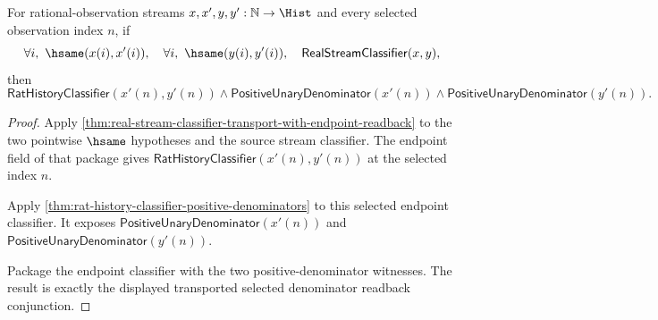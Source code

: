 \begin{theorem}
\label{thm:real-stream-classifier-transported-selected-positive-denominator-package}
For rational-observation streams $x,x',y,y':\mathbb{N}\to\Hist$ and every
selected observation index $n$, if
$$
\forall i,\ \hsame(x(i),x'(i)),\quad
\forall i,\ \hsame(y(i),y'(i)),\quad
\mathsf{RealStreamClassifier}(x,y),
$$
then
$$
\mathsf{RatHistoryClassifier}(x'(n),y'(n))\land
\mathsf{PositiveUnaryDenominator}(x'(n))\land
\mathsf{PositiveUnaryDenominator}(y'(n)).
$$
\end{theorem}
\begin{proof}
Apply \autoref{thm:real-stream-classifier-transport-with-endpoint-readback}
to the two pointwise $\hsame$ hypotheses and the source stream classifier. The
endpoint field of that package gives
$\mathsf{RatHistoryClassifier}(x'(n),y'(n))$ at the selected index $n$.

Apply \autoref{thm:rat-history-classifier-positive-denominators} to this
selected endpoint classifier. It exposes
$\mathsf{PositiveUnaryDenominator}(x'(n))$ and
$\mathsf{PositiveUnaryDenominator}(y'(n))$.

Package the endpoint classifier with the two positive-denominator witnesses.
The result is exactly the displayed transported selected denominator readback
conjunction.
\end{proof}

